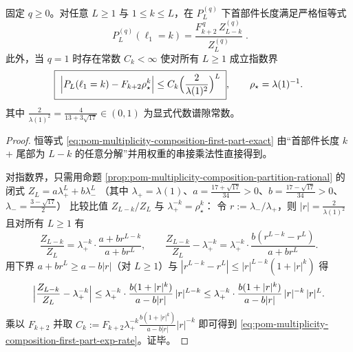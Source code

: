 \begin{proposition}[首部件长度的有限窗精确公式与指数收敛速率]\label{prop:pom-multiplicity-composition-first-part-exact-and-rate}
固定 \(q\ge 0\)。对任意 \(L\ge 1\) 与 \(1\le k\le L\)，在 \(P_L^{(q)}\) 下首部件长度满足严格恒等式
\begin{equation}\label{eq:pom-multiplicity-composition-first-part-exact}
\boxed{\;
P_L^{(q)}(\ell_1=k)=\frac{F_{k+2}^{\,q}\,Z_{L-k}^{(q)}}{Z_L^{(q)}}\; }.
\end{equation}
此外，当 \(q=1\) 时存在常数 \(C_k<\infty\) 使对所有 \(L\ge 1\) 成立指数界
\begin{equation}\label{eq:pom-multiplicity-composition-first-part-exp-rate}
\boxed{\;
\Bigl|P_L(\ell_1=k)-F_{k+2}\rho_\star^{k}\Bigr|
\le C_k\Bigl(\frac{2}{\lambda(1)^2}\Bigr)^{L}\; } ,
\qquad
\rho_\star=\lambda(1)^{-1}.
\end{equation}
其中 \(\frac{2}{\lambda(1)^2}=\frac{4}{13+3\sqrt{17}}\in(0,1)\) 为显式代数谱隙常数。
\end{proposition}
\begin{proof}
恒等式 \eqref{eq:pom-multiplicity-composition-first-part-exact} 由“首部件长度 \(k\) + 尾部为 \(L-k\) 的任意分解”并用权重的串接乘法性直接得到。
\par
对指数界，只需用命题 \ref{prop:pom-multiplicity-composition-partition-rational} 的闭式
\(
Z_L=a\lambda_+^L+b\lambda_-^L
\)
（其中 \(\lambda_+=\lambda(1)\)、\(a=\frac{17+\sqrt{17}}{34}>0\)、\(b=\frac{17-\sqrt{17}}{34}>0\)、\(\lambda_-=\frac{3-\sqrt{17}}{2}\)）
比较比值 \(Z_{L-k}/Z_L\) 与 \(\lambda_+^{-k}=\rho_\star^{k}\)：
令 \(r:=\lambda_-/\lambda_+\)，则 \(|r|=\frac{2}{\lambda(1)^2}\) 且对所有 \(L\ge 1\) 有
\[
\frac{Z_{L-k}}{Z_L}
=\lambda_+^{-k}\cdot\frac{a+br^{L-k}}{a+br^L},
\qquad
\frac{Z_{L-k}}{Z_L}-\lambda_+^{-k}
=\lambda_+^{-k}\cdot\frac{b(r^{L-k}-r^L)}{a+br^L}.
\]
用下界 \(a+br^L\ge a-b|r|\)（对 \(L\ge 1\)）与 \(|r^{L-k}-r^L|\le |r|^{L-k}(1+|r|^k)\) 得
\[
\Bigl|\frac{Z_{L-k}}{Z_L}-\lambda_+^{-k}\Bigr|
\le
\lambda_+^{-k}\cdot \frac{b(1+|r|^k)}{a-b|r|}\,|r|^{L-k}
\le
\lambda_+^{-k}\cdot \frac{b(1+|r|^k)}{a-b|r|}\,|r|^{-k}\,|r|^L.
\]
乘以 \(F_{k+2}\) 并取
\(
C_k:=F_{k+2}\lambda_+^{-k}\frac{b(1+|r|^k)}{a-b|r|}|r|^{-k}
\)
即可得到 \eqref{eq:pom-multiplicity-composition-first-part-exp-rate}。证毕。
\end{proof}

